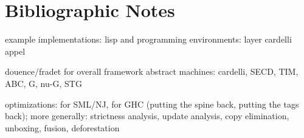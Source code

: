 \label{functional:compiling}

\section{Bibliographic Notes}
example implementations:
lisp and programming environments: layer
cardelli
appel

douence/fradet for overall framework
abstract machines: cardelli, SECD, TIM, ABC, G, nu-G, STG

optimizations: for SML/NJ, for GHC (putting the spine back, putting the tags back); more generally: strictness analysis, update analysis, copy elimination, unboxing, fusion, deforestation